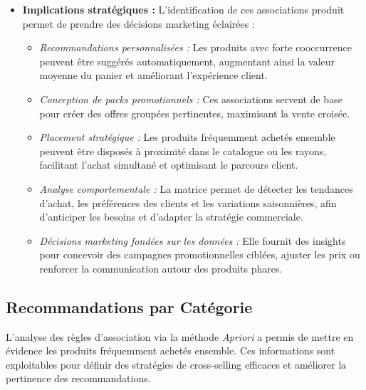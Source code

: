 \documentclass[a4paper,12pt]{article}
\begin{document}
\begin{itemize}
    \item \textbf{Implications stratégiques :}  
    L'identification de ces associations produit permet de prendre des décisions marketing éclairées :  
    \begin{itemize}
        \item \textit{Recommandations personnalisées :} Les produits avec forte cooccurrence peuvent être suggérés automatiquement, augmentant ainsi la valeur moyenne du panier et améliorant l'expérience client.  
        \item \textit{Conception de packs promotionnels :} Ces associations servent de base pour créer des offres groupées pertinentes, maximisant la vente croisée.  
        \item \textit{Placement stratégique :} Les produits fréquemment achetés ensemble peuvent être disposés à proximité dans le catalogue ou les rayons, facilitant l'achat simultané et optimisant le parcours client.  
        \item \textit{Analyse comportementale :} La matrice permet de détecter les tendances d'achat, les préférences des clients et les variations saisonnières, afin d'anticiper les besoins et d'adapter la stratégie commerciale.  
        \item \textit{Décisions marketing fondées sur les données :} Elle fournit des insights pour concevoir des campagnes promotionnelles ciblées, ajuster les prix ou renforcer la communication autour des produits phares.
    \end{itemize}
\end{itemize}

\subsection{Recommandations par Catégorie}

L'analyse des règles d'association via la méthode \textit{Apriori} a permis de mettre en évidence les produits fréquemment achetés ensemble. Ces informations sont exploitables pour définir des stratégies de cross-selling efficaces et améliorer la pertinence des recommandations.
\end{document}
